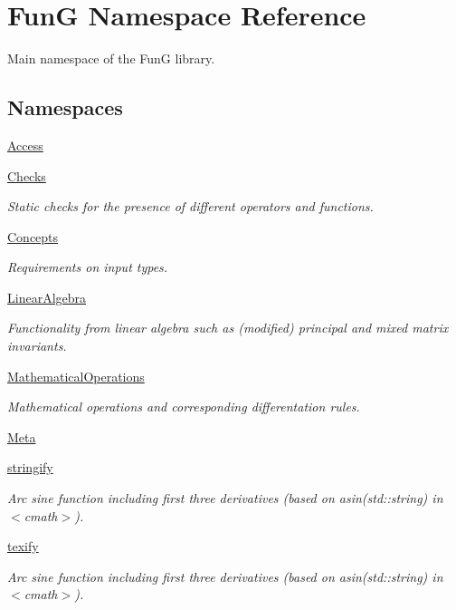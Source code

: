\hypertarget{namespaceFunG}{\section{Fun\-G Namespace Reference}
\label{namespaceFunG}
}


Main namespace of the Fun\-G library.  


\subsection*{Namespaces}
\begin{DoxyCompactItemize}
\item 
\hyperlink{namespaceFunG_1_1Access}{Access}
\item 
\hyperlink{namespaceFunG_1_1Checks}{Checks}
\begin{DoxyCompactList}\small\item\em Static checks for the presence of different operators and functions. \end{DoxyCompactList}\item 
\hyperlink{namespaceFunG_1_1Concepts}{Concepts}
\begin{DoxyCompactList}\small\item\em Requirements on input types. \end{DoxyCompactList}\item 
\hyperlink{namespaceFunG_1_1LinearAlgebra}{Linear\-Algebra}
\begin{DoxyCompactList}\small\item\em Functionality from linear algebra such as (modified) principal and mixed matrix invariants. \end{DoxyCompactList}\item 
\hyperlink{namespaceFunG_1_1MathematicalOperations}{Mathematical\-Operations}
\begin{DoxyCompactList}\small\item\em Mathematical operations and corresponding differentation rules. \end{DoxyCompactList}\item 
\hyperlink{namespaceFunG_1_1Meta}{Meta}
\item 
\hyperlink{namespaceFunG_1_1stringify}{stringify}
\begin{DoxyCompactList}\small\item\em Arc sine function including first three derivatives (based on asin(std\-::string) in $<$cmath$>$). \end{DoxyCompactList}\item 
\hyperlink{namespaceFunG_1_1texify}{texify}
\begin{DoxyCompactList}\small\item\em Arc sine function including first three derivatives (based on asin(std\-::string) in $<$cmath$>$). \end{DoxyCompactList}\end{DoxyCompactItemize}
